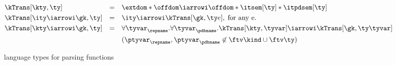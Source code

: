 {%





\begin{figure}
\small
\fbox{$\kTrans[\gk,\ty] = \ity$} 
    
\begin{align*}
  &\kTrans[\kty,\ty] & = & \quad \extdom * \offdom \iarrowi \offdom * \itsem[\ty] * \itpdsem[\ty]
   \\
   &\kTrans[\ity \iarrowi \gk,\ty] & = & \quad \ity \iarrowi \kTrans[\gk,\ty e],
   \; \mbox{for any e}.
   \\
   &\kTrans[\kty \iarrowi \gk,\ty] & = & \quad 
      \forall\tyvar_\repname.\forall\tyvar_\pdbname.
         \kTrans[\kty,\tyvar] \iarrowi \kTrans[\gk,\ty \tyvar] \\
         & & & \quad (\ptyvar_\repname, \ptyvar_\pdbname \not \in \ftv \kind \cup
         \ftv \ty)
\end{align*}  
  \caption{\Implang{} language types for parsing functions}
  \label{fig:parser-types}
\end{figure}

}
